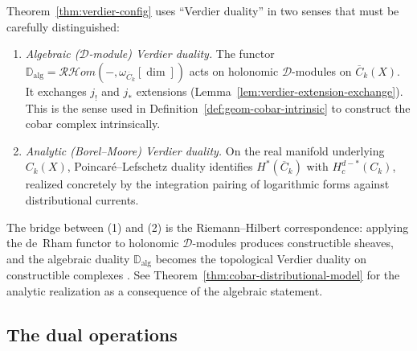 \begin{remark}\label{rem:verdier-bridge}
Theorem~\ref{thm:verdier-config} uses ``Verdier duality'' in two senses that
must be carefully distinguished:
\begin{enumerate}
\item \emph{Algebraic ($\mathcal{D}$-module) Verdier duality.}
The functor $\mathbb{D}_{\mathrm{alg}} = \mathcal{RH}om(-,
\omega_{\overline{C}_k}[\dim])$ acts on holonomic
$\mathcal{D}$-modules on $\overline{C}_k(X)$. It exchanges
$j_!$ and $j_*$ extensions (Lemma~\ref{lem:verdier-extension-exchange}).
This is the sense used in Definition~\ref{def:geom-cobar-intrinsic} to
construct the cobar complex intrinsically.
\item \emph{Analytic (Borel--Moore) Verdier duality.}
On the real manifold underlying $C_k(X)$, Poincar\'e--Lefschetz
duality identifies $H^*(\overline{C}_k)$ with $H^{d-*}_c(C_k)$,
realized concretely by the integration pairing of logarithmic forms
against distributional currents.
\end{enumerate}
The bridge between (1) and (2) is the Riemann--Hilbert correspondence:
applying the de~Rham functor to holonomic $\mathcal{D}$-modules produces
constructible sheaves, and the algebraic duality $\mathbb{D}_{\mathrm{alg}}$
becomes the topological Verdier duality on constructible complexes
\cite{KS90}. See Theorem~\ref{thm:cobar-distributional-model}
for the analytic realization as a consequence of the algebraic statement.
\end{remark}

\subsection{The dual operations}

